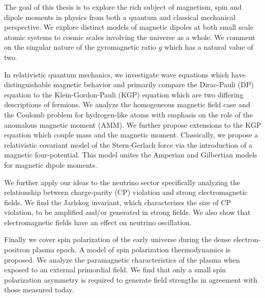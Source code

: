 

The goal of this thesis is to explore the rich subject of magnetism, spin and dipole moments in physics from both a quantum and classical mechanical perspective. We explore distinct models of magnetic dipoles at both small scale atomic systems to cosmic scales involving the universe as a whole. We comment on the singular nature of the gyromagnetic ratio $g$ which has a natural value of two.

In relativistic quantum mechanics, we investigate wave equations which have distinguishable magnetic behavior and primarily compare the Dirac-Pauli (DP) equation to the Klein-Gordon-Pauli (KGP) equation which are two differing descriptions of fermions. We analyze the homogeneous magnetic field case and the Coulomb problem for hydrogen-like atoms with emphasis on the role of the anomalous magnetic moment (AMM). We further propose extensions to the KGP equation which couple mass and the magnetic moment. Classically, we propose a relativistic covariant model of the Stern-Gerlach force via the introduction of a magnetic four-potential. This model unites the Amperian and Gilbertian models for magnetic dipole moments.

We further apply our ideas to the neutrino sector specifically analyzing the relationship between charge-parity (CP) violation and strong electromagnetic fields. We find the Jarlskog invariant, which characterizes the size of CP violation, to be amplified and/or generated in strong fields. We also show that electromagnetic fields have an effect on neutrino oscillation.

Finally we cover spin polarization of the early universe during the dense electron-positron plasma epoch. A model of spin polarization thermodynamics is proposed. We analyze the paramagnetic characteristics of the plasma when exposed to an external primordial field. We find that only a small spin polarization asymmetry is required to generate field strengths in agreement with those measured today.